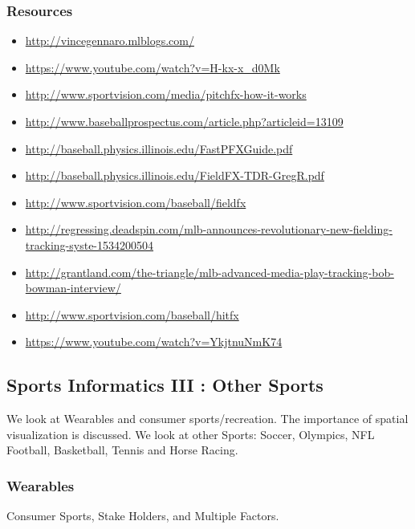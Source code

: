 \subsubsection{Resources}\label{resources-1}

\begin{itemize}
\item
  \url{http://vincegennaro.mlblogs.com/}
\item
  \url{https://www.youtube.com/watch?v=H-kx-x_d0Mk}
\item
  \url{http://www.sportvision.com/media/pitchfx-how-it-works}
\item
  \url{http://www.baseballprospectus.com/article.php?articleid=13109}
\item
  \url{http://baseball.physics.illinois.edu/FastPFXGuide.pdf}
\item
  \url{http://baseball.physics.illinois.edu/FieldFX-TDR-GregR.pdf}
\item
  \url{http://www.sportvision.com/baseball/fieldfx}
\item
  \url{http://regressing.deadspin.com/mlb-announces-revolutionary-new-fielding-tracking-syste-1534200504}
\item
  \url{http://grantland.com/the-triangle/mlb-advanced-media-play-tracking-bob-bowman-interview/}
\item
  \url{http://www.sportvision.com/baseball/hitfx}
\item
  \url{https://www.youtube.com/watch?v=YkjtnuNmK74}
\end{itemize}

\subsection{Sports Informatics III : Other
Sports}\label{sports-informatics-iii-other-sports}

We look at Wearables and consumer sports/recreation. The importance of
spatial visualization is discussed. We look at other Sports: Soccer,
Olympics, NFL Football, Basketball, Tennis and Horse Racing.




\subsubsection{Wearables}\label{wearables}

Consumer Sports, Stake Holders, and Multiple Factors.


